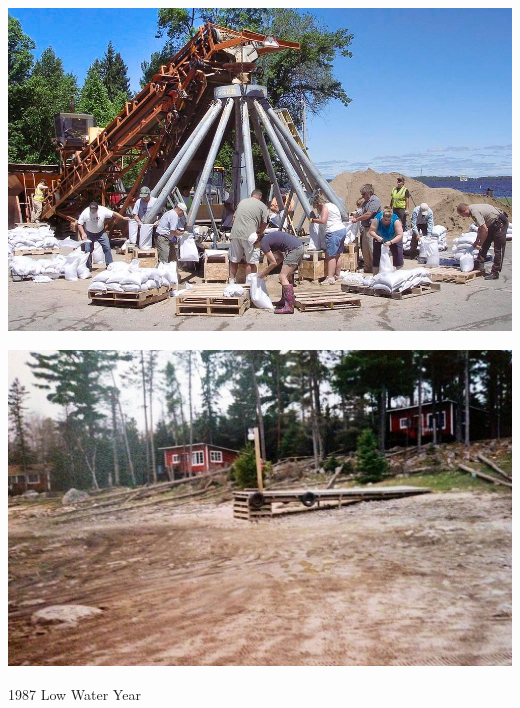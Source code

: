 \documentclass[compress,english]{beamer}
\begin{document}
{{{{\usebackgroundtemplate%
	{\includegraphics[height=\paperheight]{myersFLOOD0618c10_0.jpg}}

\begin{frame}{}

\footnotetext{\color{white}{Photo by John Meyers, Duluth News Tribune}}
  
\end{frame}
}


{{\usebackgroundtemplate%
	{\includegraphics[height=\paperheight]{1987_drought_on_Kabetogama_2.png}}

\begin{frame}{1987 Low Water Year}

\footnotetext{\color{white}{Photo by Larry Kec}}

\end{frame}
}

}}}}
\end{document}
